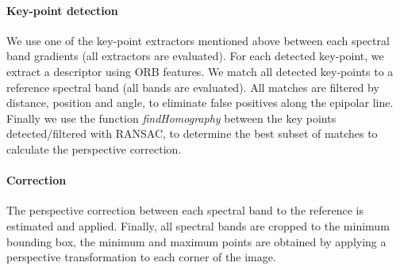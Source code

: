 \documentclass[]{elsarticle}
\begin{document}
	\paragraph{Key-point detection} \label{sec:perspective}
	We use one of the key-point extractors mentioned above between each spectral band gradients (all extractors are evaluated).
	For each detected key-point, we extract a descriptor using ORB features.
	We match all detected key-points to a reference spectral band (all bands are evaluated).
	All matches are filtered by distance, position and angle, to eliminate false positives along the epipolar line.
	Finally we use the function \textit{findHomography} between the key points detected/filtered with RANSAC,
	to determine the best subset of matches to calculate the perspective correction.
	
	
	\paragraph{Correction}
	
	The perspective correction between each spectral band to the reference is estimated and applied.
	Finally, all spectral bands are cropped to the minimum bounding box,
	the minimum and maximum points are obtained by applying a perspective transformation to each corner of the image.
	
	
\end{document}
